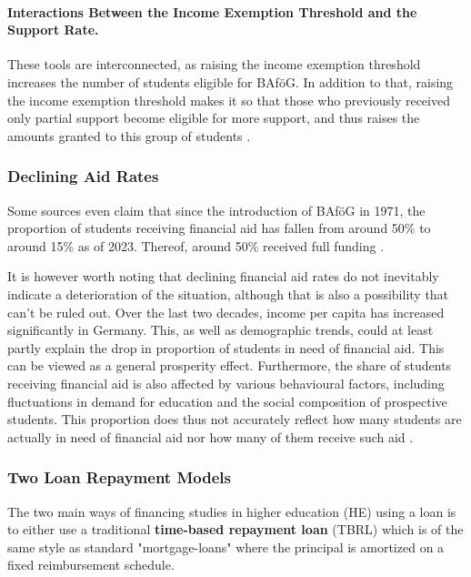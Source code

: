 \paragraph{Interactions Between the Income Exemption Threshold and the Support Rate.}
These tools are interconnected, as raising the income exemption threshold increases the number of students eligible for BAföG. In addition to that, raising the income exemption threshold makes it so that those who previously received only partial support become eligible for more support, and thus raises the amounts granted to this group of students \citep{meier_bafog_2024}.

\subsubsection{Declining Aid Rates}
\label{subsection:declining-aid-rates}

Some sources even claim that since the introduction of BAföG in 1971, the proportion of students receiving financial aid has fallen from around 50\% to around 15\% as of 2023. Thereof, around 50\% received full funding \citep{meier_bafog_2024}.

It is however worth noting that declining financial aid rates do not inevitably indicate a deterioration of the situation, although that is also a possibility that can’t be ruled out. Over the last two decades, income per capita has increased significantly in Germany. This, as well as demographic trends, could at least partly explain the drop in proportion of students in need of financial aid. This can be viewed as a general prosperity effect. Furthermore, the share of students receiving financial aid is also affected by various behavioural factors, including fluctuations in demand for education and the social composition of prospective students. This proportion does thus not accurately reflect how many students are actually in need of financial aid nor how many of them receive such aid \citep{meier_bafog_2024}.

\subsubsection{Two Loan Repayment Models}
\label{subsection:loan-repayment-plan}
The two main ways of financing studies in higher education (HE) using a loan is to either use a traditional 
\textbf{time-based repayment loan} (TBRL) which is of the same style as standard "mortgage-loans" 
where the principal is amortized on a fixed reimbursement schedule.

